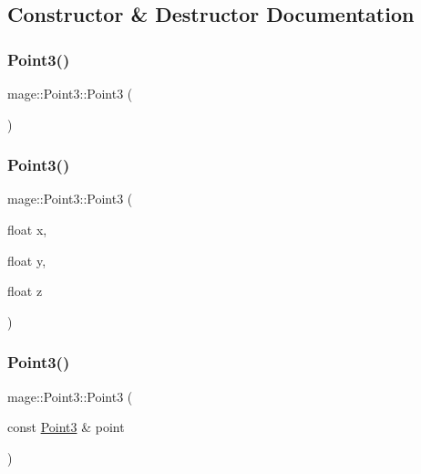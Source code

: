 \subsection{Constructor \& Destructor Documentation}
\hypertarget{structmage_1_1_point3_a2675c303e54c6047520bc1a298c7fef1}{}\label{structmage_1_1_point3_a2675c303e54c6047520bc1a298c7fef1} 
\subsubsection{\texorpdfstring{Point3()}{Point3()}\hspace{0.1cm}{\footnotesize\ttfamily [1/6]}}
{\footnotesize\ttfamily mage\+::\+Point3\+::\+Point3 (\begin{DoxyParamCaption}{ }\end{DoxyParamCaption})}

\hypertarget{structmage_1_1_point3_a754210fa30befab6db5957a8d9b397f2}{}\label{structmage_1_1_point3_a754210fa30befab6db5957a8d9b397f2} 
\subsubsection{\texorpdfstring{Point3()}{Point3()}\hspace{0.1cm}{\footnotesize\ttfamily [2/6]}}
{\footnotesize\ttfamily mage\+::\+Point3\+::\+Point3 (\begin{DoxyParamCaption}\item[{float}]{x,  }\item[{float}]{y,  }\item[{float}]{z }\end{DoxyParamCaption})}

\hypertarget{structmage_1_1_point3_ad2e95e6eaa32339663e35f936990eb0c}{}\label{structmage_1_1_point3_ad2e95e6eaa32339663e35f936990eb0c} 
\subsubsection{\texorpdfstring{Point3()}{Point3()}\hspace{0.1cm}{\footnotesize\ttfamily [3/6]}}
{\footnotesize\ttfamily mage\+::\+Point3\+::\+Point3 (\begin{DoxyParamCaption}\item[{const \hyperlink{structmage_1_1_point3}{Point3} \&}]{point }\end{DoxyParamCaption})}

